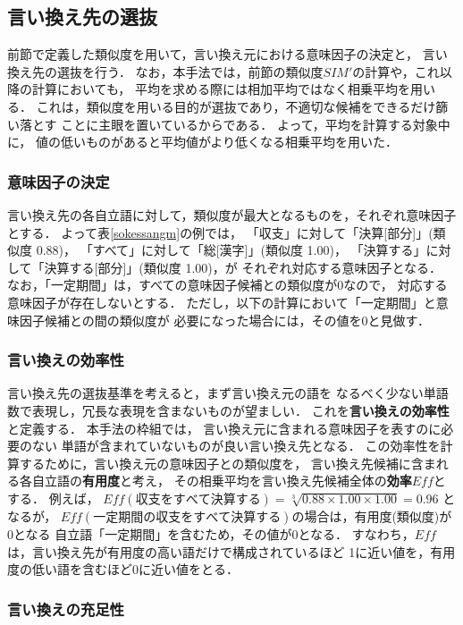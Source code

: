   \subsection{言い換え先の選抜}
\label{subsec:screen}
前節で定義した類似度を用いて，言い換え元における意味因子の決定と，
言い換え先の選抜を行う．
なお，本手法では，前節の類似度$SIM'$の計算や，これ以降の計算においても，
平均を求める際には相加平均ではなく相乗平均を用いる．
これは，類似度を用いる目的が選抜であり，不適切な候補をできるだけ篩い落とす
ことに主眼を置いているからである．
よって，平均を計算する対象中に，
値の低いものがあると平均値がより低くなる相乗平均を用いた．

  \subsubsection{意味因子の決定}

言い換え先の各自立語に対して，類似度が最大となるものを，それぞれ意味因子とする．
よって表\ref{sokessangm}の例では，
  「収支」に対して「決算[部分]」(類似度 0.88)，
  「すべて」に対して「総[漢字]」(類似度 1.00)，
  「決算する」に対して「決算する[部分]」(類似度 1.00)，が
それぞれ対応する意味因子となる．
なお，「一定期間」は，すべての意味因子候補との類似度が0なので，
対応する意味因子が存在しないとする．
ただし，以下の計算において「一定期間」と意味因子候補との間の類似度が
必要になった場合には，その値を0と見做す．

  \subsubsection{言い換えの効率性}

言い換え先の選抜基準を考えると，まず言い換え元の語を
なるべく少ない単語数で表現し，冗長な表現を含まないものが望ましい．
これを{\bf 言い換えの効率性}と定義する．
本手法の枠組では，
言い換え元に含まれる意味因子を表すのに必要のない
単語が含まれていないものが良い言い換え先となる．
この効率性を計算するために，言い換え元の意味因子との類似度を，
言い換え先候補に含まれる各自立語の{\bf 有用度}と考え，
その相乗平均を言い換え先候補全体の{\bf 効率}$Eff$とする．
例えば，
$Eff(収支をすべて決算する) = \sqrt[3]{0.88\times 1.00\times 1.00}=0.96$
となるが，
$Eff(一定期間の収支をすべて決算する)$の場合は，有用度(類似度)が0となる
自立語「一定期間」を含むため，その値が0となる．
すなわち，$Eff$は，言い換え先が有用度の高い語だけで構成されているほど
1に近い値を，有用度の低い語を含むほど0に近い値をとる．


  \subsubsection{言い換えの充足性}
		 
